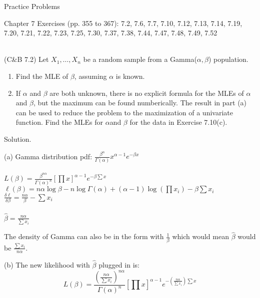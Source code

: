 \documentclass[11pt,fleqn]{book} %
\begin{document}
\begin{section}{Practice Problems}

Chapter 7 Exercises (pp. 355 to 367): 7.2, 7.6, 7.7, 7.10, 7.12, 7.13, 7.14, 7.19, 7.20, 7.21, 7.22, 7.23, 7.25, 7.30, 7.37, 7.38, 7.44, 7.47, 7.48, 7.49, 7.52\\
\\

	\begin{problem} (C\&B 7.2) Let $X_1, \dots, X_n$ be a random sample from a Gamma($\alpha, \beta$) population.

		\begin{enumerate}[label=(\alph*)] 
			\item Find the MLE of $\beta$, assuming $\alpha$ is known.
			\item If $\alpha$ and $\beta$ are both unknown, there is no explicit formula for the MLEs of $\alpha$ and $\beta$, but the maximum can be found numberically. The result in part (a) can be used to reduce the problem to the maximization of a univariate function. Find the MLEs for $\alpha$and $\beta$ for the data in Exercise 7.10(c).
		\end{enumerate}

			Solution.

			(a) Gamma distribution pdf: $\frac{\beta^\alpha}{\Gamma(\alpha)}x^{\alpha-1}e^{-\beta x}$\\
			\\
			$L(\beta) = \frac{\beta^{n\alpha}}{\Gamma(\alpha)^n}[\prod x]^{\alpha-1}e^{-\beta \sum x}$\\

			$\ell(\beta) = n\alpha\log\beta - n\log\Gamma(\alpha) +(\alpha-1)\log(\prod x_i) - \beta \sum x_i $\\

			$\frac{\delta \ell}{\delta \beta} = \frac{n\alpha}{\beta} - \sum x_i$\\
			\\
			$\hat{\beta} = \frac{n\alpha}{\sum x_i}$

			\begin{remark}
				The density of Gamma can also be in the form with $\frac{1}{\beta}$ which would mean $\hat{\beta}$ would be $\frac{\sum x_i}{n\alpha} $.
			\end{remark} 

			(b) The new likelihood with $\hat{\beta}$ plugged in is:
			$$ L(\beta) = \frac{(\frac{n\alpha}{\sum x_i})^{n\alpha}}{\Gamma(\alpha)^n}[\prod x]^{\alpha-1}e^{-(\frac{n\alpha}{\sum x_i}) \sum x}$$ 


\end{problem}
\end{section}
\end{document}
